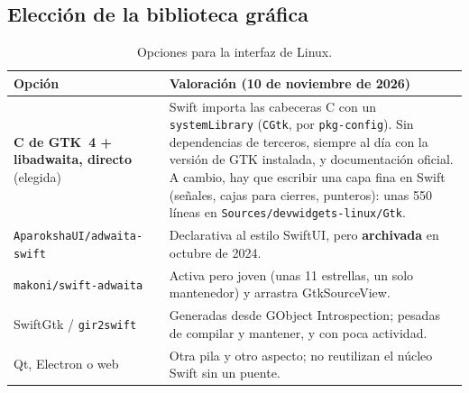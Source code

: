 \documentclass[11pt,a4paper]{article}
\begin{document}
\subsection{Elección de la biblioteca gráfica}
\begin{table}[H]
\centering
\begin{tabularx}{\textwidth}{@{}lX@{}}
\toprule
\textbf{Opción} & \textbf{Valoración (10 de noviembre de 2026)}\\
\midrule
\textbf{C de GTK~4 + libadwaita, directo} (elegida) & Swift importa
las cabeceras C con un \texttt{systemLibrary} (\texttt{CGtk}, por
\texttt{pkg-config}). Sin dependencias de terceros, siempre al día con
la versión de GTK instalada, y documentación oficial. A cambio, hay
que escribir una capa fina en Swift (señales, cajas para cierres,
punteros): unas 550 líneas en \texttt{Sources/devwidgets-linux/Gtk}.\\
\texttt{AparokshaUI/adwaita-swift} & Declarativa al estilo SwiftUI,
pero \textbf{archivada} en octubre de 2024.\\
\texttt{makoni/swift-adwaita} & Activa pero joven (unas 11 estrellas,
un solo mantenedor) y arrastra GtkSourceView.\\
SwiftGtk / \texttt{gir2swift} & Generadas desde GObject
Introspection; pesadas de compilar y mantener, y con poca actividad.\\
Qt, Electron o web & Otra pila y otro aspecto; no reutilizan el
núcleo Swift sin un puente.\\
\bottomrule
\end{tabularx}
\caption{Opciones para la interfaz de Linux.}
\end{table}
\end{document}
